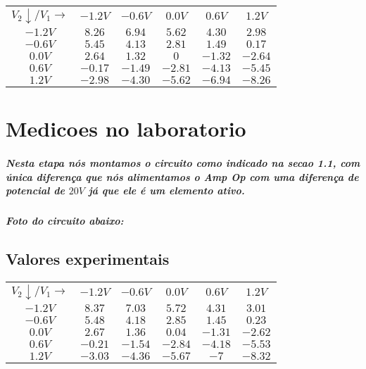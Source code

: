 \documentclass[12pt,twoside, a4paper, twocolumn]{article}
\begin{document}
\begin{center}
    \begin{tabular}{ |c|ccccc| }
        \hline
        $V_2 \downarrow / V_1 \rightarrow $ & $-1.2V$ & $-0.6V$ & $0.0V$  & $0.6V$  & $1.2V$  \\
        $-1.2V$                             & $8.26$  & $6.94$  & $5.62$  & $4.30$  & $2.98$  \\
        $ -0.6V$                            & $5.45$  & $4.13$  & $2.81$  & $1.49$  & $0.17$  \\
        $0.0V$                              & $2.64$  & $1.32$  & $0$     & $-1.32$ & $-2.64$ \\
        $ 0.6V$                             & $-0.17$ & $-1.49$ & $-2.81$ & $-4.13$ & $-5.45$ \\
        $ 1.2V$                             & $-2.98$ & $-4.30$ & $-5.62$ & $-6.94$ & $-8.26$ \\
        \hline
    \end{tabular}
\end{center}

\section{Medicoes no laboratorio}

\subparagraph*{Nesta etapa nós montamos o circuito como indicado na secao 1.1, com única diferença que nós alimentamos o Amp Op com uma diferença de potencial de $20V$ já que ele é um elemento ativo.}

\subparagraph*{Foto do circuito abaixo:}
\subparagraph*{}


\subsection{Valores experimentais}

\begin{center}
    \begin{tabular}{ |c|ccccc| }
        \hline
        $V_2 \downarrow / V_1 \rightarrow $ & $-1.2V$ & $-0.6V$ & $0.0V$  & $0.6V$  & $1.2V$  \\
        $-1.2V$                             & $8.37$  & $7.03$  & $5.72$  & $4.31$  & $3.01$  \\
        $ -0.6V$                            & $5.48$  & $4.18$  & $2.85$  & $1.45$  & $0.23$  \\
        $0.0V$                              & $2.67$  & $1.36$  & $0.04$  & $-1.31$ & $-2.62$ \\
        $ 0.6V$                             & $-0.21$ & $-1.54$ & $-2.84$ & $-4.18$ & $-5.53$ \\
        $ 1.2V$                             & $-3.03$ & $-4.36$ & $-5.67$ & $-7$    & $-8.32$ \\
        \hline
    \end{tabular}
\end{center}
\end{document}

